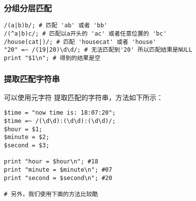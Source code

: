 \documentclass{article}
\begin{document}
\subsubsection{分组分层匹配}
\begin{verbatim}
/(a|b)b/; # 匹配 'ab' 或者 'bb'
/(^a|b)c/; # 匹配以a开头的 'ac' 或者任意位置的 'bc'
/house(cat|)/; # 匹配 'housecat' 或者 'house'
"20" =~ /(19|20)\d\d/; # 无法匹配到'20' 所以匹配结果是NULL
print "$1\n"; # 得到的结果是空
\end{verbatim}

\subsubsection{提取匹配字符串}
可以使用元字符 \code{()} 提取匹配的字符串，方法如下所示：

\begin{verbatim}
$time = "now time is: 18:07:20";
$time =~ /(\d\d):(\d\d):(\d\d)/;
$hour = $1;
$minute = $2;
$second = $3;

print "hour = $hour\n"; #18
print "minute = $minute\n"; #07
print "second = $second\n"; #20

# 另外，我们使用下面的方法比较酷

\end{verbatim}
\end{document}
